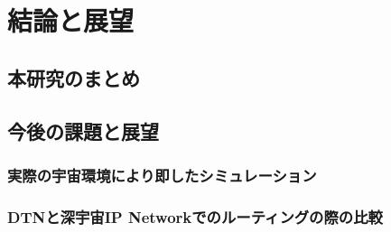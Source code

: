\chapter{結論と展望}
\label{chap:conclusion}
\section{本研究のまとめ}
\section{今後の課題と展望}
\subsection{実際の宇宙環境により即したシミュレーション}
\subsection{DTNと深宇宙IP Networkでのルーティングの際の比較}